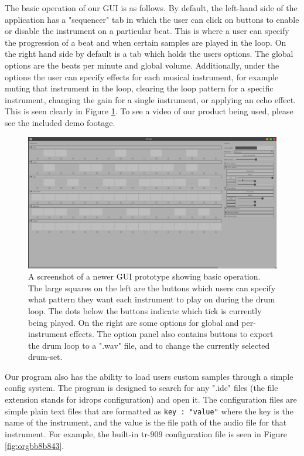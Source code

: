 \documentclass[11pt]{article}
\begin{document}
The basic operation of our GUI is as follows. By default, the
left-hand side of the application has a "sequencer" tab in which the
user can click on buttons to enable or disable the instrument on a
particular beat. This is where a user can specify the progression of a
beat and when certain samples are played in the loop. On the right
hand side by default is a tab which holds the users options. The
global options are the beats per minute and global
volume. Additionally, under the options the user can specify effects
for each musical instrument, for example muting that instrument in the
loop, clearing the loop pattern for a specific instrument, changing
the gain for a single instrument, or applying an echo effect. This is
seen clearly in Figure \ref{fig:org1c2ae93}. To see a video of our product
being used, please see the included demo footage.

\begin{figure}[htbp]
\centering
\includegraphics[width=15cm]{./GUI_1.png}
\caption{\label{fig:org1c2ae93}
A screenshot of a newer GUI prototype showing basic operation. The large squares on the left are the buttons which users can specify what pattern they want each instrument to play on during the drum loop. The dots below the buttons indicate which tick is currently being played. On the right are some options for global and per-instrument effects. The option panel also contains buttons to export the drum loop to a ".wav" file, and to change the currently selected drum-set.}
\end{figure}

Our program also has the ability to load users custom samples through
a simple config system. The program is designed to search for any
".idc" files (the file extension stands for idrops configuration) and
open it. The configuration files are simple plain text files that are
formatted as \texttt{key : "value"} where the key is the name of the
instrument, and the value is the file path of the audio file for that
instrument. For example, the built-in tr-909 configuration file is seen in
Figure \ref{fig:orgbb8b843}.
\end{document}
